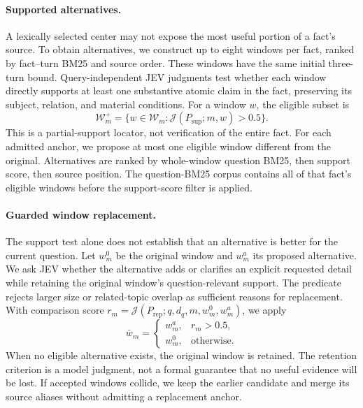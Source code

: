 \documentclass[11pt]{article}
\newcommand{\jev}{\mathcal{J}}
\begin{document}
\paragraph{Supported alternatives.}
A lexically selected center may not expose the most useful portion of a fact's source. To obtain alternatives, we construct up to eight windows per fact, ranked by fact--turn BM25 and source order. These windows have the same initial three-turn bound. Query-independent JEV judgments test whether each window directly supports at least one substantive atomic claim in the fact, preserving its subject, relation, and material conditions. For a window $w$, the eligible subset is
\begin{equation}
 \mathcal{W}^{+}_m=\{w\in\mathcal{W}_m:
 \jev(P_{\mathrm{sup}};m,w)>0.5\}.
 \label{eq:partial-support}
\end{equation}
This is a partial-support locator, not verification of the entire fact. For each admitted anchor, we propose at most one eligible window different from the original. Alternatives are ranked by whole-window question BM25, then support score, then source position. The question-BM25 corpus contains all of that fact's eligible windows before the support-score filter is applied.

\paragraph{Guarded window replacement.}
The support test alone does not establish that an alternative is better for the current question. Let $w_m^0$ be the original window and $w_m^a$ its proposed alternative. We ask JEV whether the alternative adds or clarifies an explicit requested detail while retaining the original window's question-relevant support. The predicate rejects larger size or related-topic overlap as sufficient reasons for replacement. With comparison score $r_m=\jev(P_{\mathrm{rep}};q,d_q,m,w_m^0,w_m^a)$, we apply
\begin{equation}
 \bar w_m=
 \begin{cases}
 w_m^a,&r_m>0.5,\\
 w_m^0,&\text{otherwise}.
 \end{cases}
 \label{eq:replacement}
\end{equation}
When no eligible alternative exists, the original window is retained. The retention criterion is a model judgment, not a formal guarantee that no useful evidence will be lost. If accepted windows collide, we keep the earlier candidate and merge its source aliases without admitting a replacement anchor.
\end{document}
